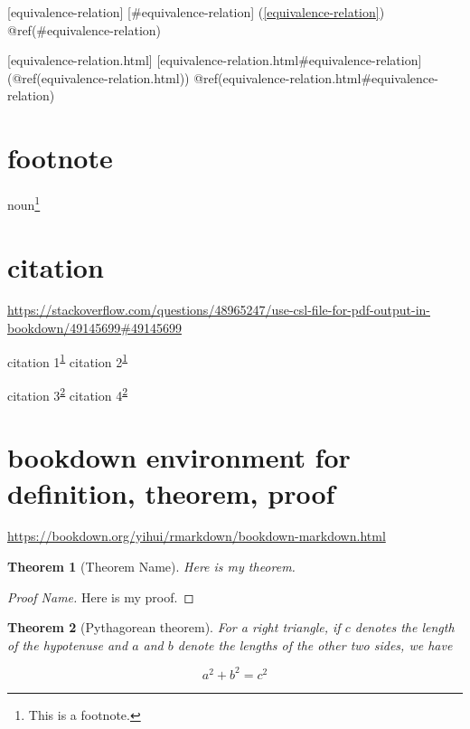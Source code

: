 \documentclass[
]{book}
\newtheorem{theorem}{Theorem}[chapter]
\theoremstyle{definition}
\theoremstyle{definition}
\theoremstyle{definition}
\theoremstyle{definition}
\theoremstyle{remark}
\begin{document}
{[}equivalence-relation{]} {[}\#equivalence-relation{]} (\ref{equivalence-relation}) @ref(\#equivalence-relation)

{[}equivalence-relation.html{]} {[}equivalence-relation.html\#equivalence-relation{]} (@ref(equivalence-relation.html)) @ref(equivalence-relation.html\#equivalence-relation)

\hypertarget{footnote}{%
\section{footnote}\label{footnote}}

noun\footnote{This is a footnote.}

\hypertarget{citation}{%
\section{citation}\label{citation}}

\url{https://stackoverflow.com/questions/48965247/use-csl-file-for-pdf-output-in-bookdown/49145699\#49145699}

citation 1\textsuperscript{\protect\hyperlink{ref-noauthor_bookdown_2019}{1}} citation 2\textsuperscript{\protect\hyperlink{ref-noauthor_bookdown_2019}{1}}

citation 3\textsuperscript{\protect\hyperlink{ref-ccjou2009}{2}} citation 4\textsuperscript{\protect\hyperlink{ref-ccjou2009}{2}}

\hypertarget{bookdown-environment-for-definition-theorem-proof}{%
\section{bookdown environment for definition, theorem, proof}\label{bookdown-environment-for-definition-theorem-proof}}

\url{https://bookdown.org/yihui/rmarkdown/bookdown-markdown.html}

\begin{theorem}[Theorem Name]
\protect\hypertarget{thm:label}{}\label{thm:label}Here is my theorem.
\end{theorem}

\begin{proof}[Proof Name]
Here is my proof.
\end{proof}

\begin{theorem}[Pythagorean theorem]
\protect\hypertarget{thm:pyth}{}\label{thm:pyth}For a right triangle, if \(c\) denotes the length of the hypotenuse
and \(a\) and \(b\) denote the lengths of the other two sides, we have

\[a^2 + b^2 = c^2\]
\end{theorem}
\end{document}
